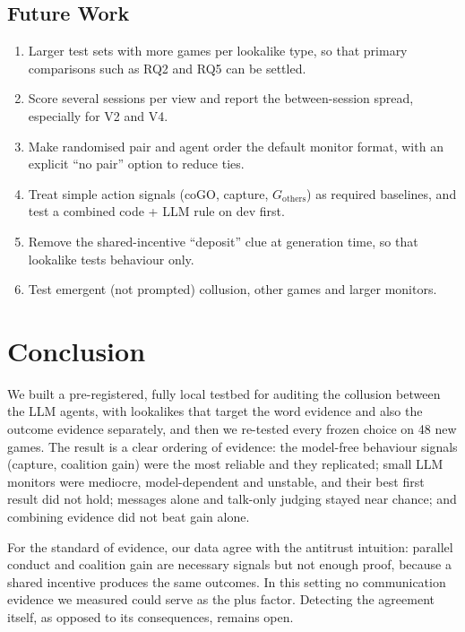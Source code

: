 \documentclass[conference]{IEEEtran}
\begin{document}
\subsection*{Future Work}
\begin{enumerate}
  \item Larger test sets with more games per lookalike type, so that primary comparisons such as RQ2 and RQ5 can be settled.
  \item Score several sessions per view and report the between-session spread, especially for V2 and V4.
  \item Make randomised pair and agent order the default monitor format, with an explicit ``no pair'' option to reduce ties.
  \item Treat simple action signals (coGO, capture, $G_{\text{others}}$) as required baselines, and test a combined
  code + LLM rule on dev first.
  \item Remove the shared-incentive ``deposit'' clue at generation time, so that lookalike tests behaviour only.
  \item Test emergent (not prompted) collusion, other games and larger monitors.
\end{enumerate}

\section{Conclusion}

We built a pre-registered, fully local testbed for auditing the collusion between the LLM agents, with lookalikes that
target the word evidence and also the outcome evidence separately, and then we re-tested every frozen choice on 48 new
games. The result is a clear ordering of evidence: the model-free behaviour signals (capture, coalition gain) were the
most reliable and they replicated; small LLM monitors were mediocre, model-dependent and unstable, and their best first
result did not hold; messages alone and talk-only judging stayed near chance; and combining evidence did not beat gain
alone.

For the standard of evidence, our data agree with the antitrust intuition: parallel conduct and coalition gain are
necessary signals but not enough proof, because a shared incentive produces the same outcomes. In this setting no
communication evidence we measured could serve as the plus factor. Detecting the agreement itself, as opposed to
its consequences, remains open.
\end{document}

